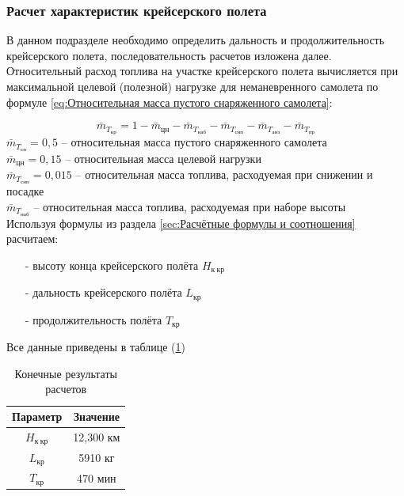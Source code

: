 \subsubsection{Расчет характеристик крейсерского полета}
\label{sec: Расчет характеристик крейсерского полета}

В данном подразделе необходимо определить дальность и
продолжительность крейсерского полета, последовательность расчетов
изложена далее.
Относительный расход топлива на участке крейсерского полета вычисляется
при максимальной целевой (полезной) нагрузке для неманевренного самолета
по формуле \ref{eq:Относительная масса пустого снаряженного самолета}: 

\begin{equation}
    \label{eq:Относительная масса пустого снаряженного самолета}
    \bar{m}_{T_\text{кр}} = 1 - \bar{m}_{\text{цн}} - \bar{m}_{T_\text{наб}} - \bar{m}_{T_\text{снп}} - \bar{m}_{T_\text{анз}} - \bar{m}_{T_\text{пр}}
\end{equation}
$\bar{m}_{T_\text{сн}} = 0,5$ -- относительная масса пустого снаряженного самолета \\ 
$\bar{m}_{\text{цн}} = 0,15$ -- относительная масса целевой нагрузки \\ 
$\bar{m}_{T_\text{снп}} = 0,015$ -- относительная масса топлива, расходуемая при снижении и
посадке \\ 
$\bar{m}_{T_\text{наб}}$ --  относительная масса топлива,
расходуемая при наборе высоты \\

Используя формулы из раздела \ref{sec:Расчётные формулы и соотношения} расчитаем: 

\begin{itemize}
    \item [-] высоту конца крейсерского полёта $H_{\text{к} \ \text{кр}}$
    \item [-] дальность крейсерского полёта $L_\text{кр}$
    \item [-] продолжительность полёта $T_\text{кр}$
\end{itemize}
Все данные приведены в таблице (\ref{tab:Крейсер})

\begin{table}[H]
    \centering
    \caption{Конечные результаты расчетов}
    \begin{tabular}{|c|c|}
    \hline
        Параметр & Значение \\ \hline
        $H_{\text{к} \ \text{кр}}$ & 12,300 км\\ \hline
        $L_\text{кр}$ & 5910 кг\\ \hline
        $T_\text{кр}$ & 470 мин\\ \hline
    \end{tabular}
    \label{tab:Крейсер}
\end{table}


